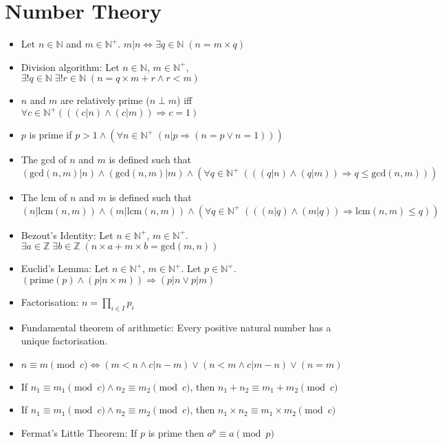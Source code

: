 \documentclass[11pt, twocolumn]{article}
\newenvironment{compactitem}
{\begin{itemize}
  \setlength{\itemsep}{1px}
  \setlength{\parskip}{0pt}
  \setlength{\parsep}{0pt}}
{\end{itemize}}
\begin{document}
\section{Number Theory}
\begin{compactitem}
\item Let $n\in \mathbb{N}$ and $m\in \mathbb{N}^+$. $m | n \Leftrightarrow \exists q \in \mathbb{N} \; (n=m\times q)$
\item Division algorithm: Let $n\in \mathbb{N}$, $m\in \mathbb{N}^+$, $\exists !q\in \mathbb{N} \; \exists !r\in \mathbb{N} \;(n=q\times m+r \wedge r<m)$
\item $n$ and $m$ are relatively prime ($n\perp m$) iff $\forall c\in \mathbb{N}^+ (((c|n)\wedge (c|m))\Rightarrow c=1)$
\item $p$ is prime if $p>1 \wedge (\forall n \in \mathbb{N}^+\;(n|p\Rightarrow (n=p\vee n=1)))$
\item The gcd of $n$ and $m$ is defined such that $(\text{gcd}(n, m) |n) \wedge (\text{gcd}(n,m) |m)\wedge (\forall q\in \mathbb{N}^+ \;(((q|n)\wedge (q|m))\Rightarrow q\leq \text{gcd}(n,m)))$
\item The lcm of $n$ and $m$ is defined such that $(n|\text{lcm}(n, m)) \wedge (m|\text{lcm}(n,m))\wedge (\forall q\in \mathbb{N}^+ \;(((n|q)\wedge (m|q))\Rightarrow \text{lcm}(n,m)\leq q))$
\item Bezout's Identity: Let $n \in \mathbb{N}^+$, $m \in \mathbb{N}^+$. $\exists a \in \mathbb{Z} \; \exists b\in \mathbb{Z} \; (n\times a + m\times b = \text{gcd}(m,n))$
\item Euclid's Lemma: Let $n \in \mathbb{N}^+$, $m \in \mathbb{N}^+$. Let $p\in \mathbb{N}^+$. $(\text{prime}(p)\wedge (p|n\times m))\Rightarrow (p|n \vee p|m)$
\item Factorisation: $n = \prod_{i\in I} p_i$
\item Fundamental theorem of arithmetic: Every positive natural number has a unique factorisation.
\item $n \equiv m \pmod{c} \Leftrightarrow (m<n\wedge c|n-m)\vee (n<m\wedge c|m-n)\vee (n=m)$
\item If $n_1\equiv m_1 \pmod{c} \wedge n_2 \equiv m_2 \pmod{c}$, then $n_1+n_2 \equiv m_1+m_2 \pmod{c}$
\item If $n_1\equiv m_1 \pmod{c} \wedge n_2 \equiv m_2 \pmod{c}$, then $n_1\times n_2 \equiv m_1\times m_2 \pmod{c}$
\item Fermat's Little Theorem: If $p$ is prime then $a^p\equiv a\pmod{p}$
\end{compactitem}
\end{document}
